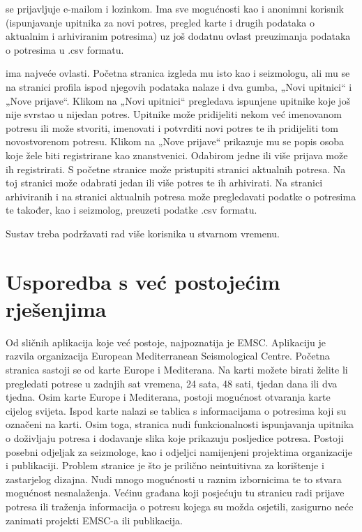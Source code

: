  se prijavljuje e-mailom i lozinkom. Ima sve mogućnosti kao i anonimni korisnik (ispunjavanje upitnika za novi potres, pregled karte i drugih podataka o aktualnim i arhiviranim potresima) uz još dodatnu ovlast preuzimanja podataka o potresima u .csv formatu.

 ima najveće ovlasti. Početna stranica izgleda mu isto kao i seizmologu, ali mu se na stranici profila ispod njegovih podataka nalaze i dva gumba, „Novi upitnici“ i „Nove prijave“. Klikom na „Novi upitnici“ pregledava ispunjene upitnike koje još nije svrstao u nijedan potres. Upitnike može pridijeliti nekom već imenovanom potresu ili može stvoriti, imenovati i potvrditi novi potres te ih pridijeliti tom novostvorenom potresu. Klikom na „Nove prijave“ prikazuje mu se popis osoba koje žele biti registrirane kao znanstvenici. Odabirom jedne ili više prijava može ih registrirati. S početne stranice može pristupiti stranici aktualnih potresa. Na toj stranici može odabrati jedan ili više potres te ih arhivirati. Na stranici arhiviranih i na stranici aktualnih potresa može pregledavati podatke o potresima te također, kao i seizmolog, preuzeti podatke .csv formatu.

Sustav treba podržavati rad više korisnika u stvarnom vremenu.\\



\section{Usporedba s već postojećim rješenjima}

{Od sličnih aplikacija koje već postoje, najpoznatija je EMSC. Aplikaciju je razvila organizacija European Mediterranean Seismological Centre. 
Početna stranica sastoji se od karte Europe i Mediterana. Na karti možete birati želite li pregledati potrese u zadnjih sat  vremena, 24 sata, 48 sati, tjedan dana ili dva tjedna. Osim karte Europe i Mediterana, postoji mogućnost otvaranja karte cijelog svijeta. 
Ispod karte nalazi se tablica s informacijama o potresima koji su označeni na karti. Osim toga, stranica nudi funkcionalnosti ispunjavanja upitnika o doživljaju potresa i dodavanje slika koje prikazuju posljedice potresa. Postoji posebni odjeljak za seizmologe, kao i odjeljci namijenjeni projektima organizacije i publikaciji. Problem stranice je što je prilično neintuitivna za korištenje i zastarjelog dizajna. Nudi mnogo mogućnosti u raznim izbornicima te to stvara mogućnost nesnalaženja. Većinu građana koji posjećuju tu stranicu radi prijave potresa ili traženja informacija o potresu kojega su možda osjetili, zasigurno neće zanimati projekti EMSC-a ili publikacija.}

